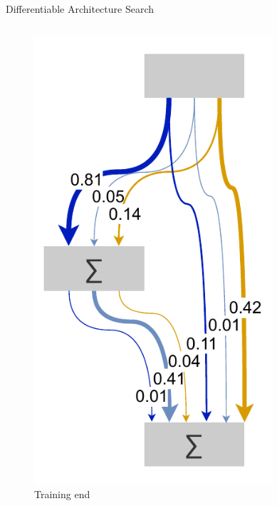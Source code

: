 \documentclass[]{beamer}
\begin{document}
\begin{frame}{Differentiable Architecture Search}
\begin{columns}
\begin{column}{.3\textwidth}
\begin{figure}
	\includegraphics[scale=0.4, center]{graphics/darts_2.pdf}
	\caption{Training end}
\end{figure}
\end{column}
\begin{column}{.35\textwidth}
\begin{figure}

\end{figure}
\end{column}
\end{columns}
\end{frame}
\end{document}
